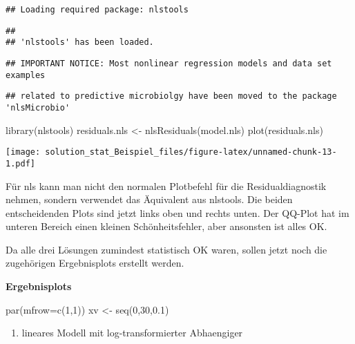 \documentclass[
]{article}
\newenvironment{Shaded}{\begin{snugshade}}{\end{snugshade}}
\newcommand{\AttributeTok}[1]{\textcolor[rgb]{0.77,0.63,0.00}{#1}}
\newcommand{\DecValTok}[1]{\textcolor[rgb]{0.00,0.00,0.81}{#1}}
\newcommand{\FloatTok}[1]{\textcolor[rgb]{0.00,0.00,0.81}{#1}}
\newcommand{\FunctionTok}[1]{\textcolor[rgb]{0.00,0.00,0.00}{#1}}
\newcommand{\NormalTok}[1]{#1}
\newcommand{\OtherTok}[1]{\textcolor[rgb]{0.56,0.35,0.01}{#1}}
\providecommand{\tightlist}{%
  \setlength{\itemsep}{0pt}\setlength{\parskip}{0pt}}
\begin{document}
\begin{verbatim}
## Loading required package: nlstools
\end{verbatim}

\begin{verbatim}
## 
## 'nlstools' has been loaded.
\end{verbatim}

\begin{verbatim}
## IMPORTANT NOTICE: Most nonlinear regression models and data set examples
\end{verbatim}

\begin{verbatim}
## related to predictive microbiolgy have been moved to the package 'nlsMicrobio'
\end{verbatim}

\begin{Shaded}
\begin{Highlighting}[]
\FunctionTok{library}\NormalTok{(nlstools)}
\NormalTok{residuals.nls }\OtherTok{\textless{}{-}} \FunctionTok{nlsResiduals}\NormalTok{(model.nls)}
\FunctionTok{plot}\NormalTok{(residuals.nls)}
\end{Highlighting}
\end{Shaded}

\texttt{[image: solution\_stat\_Beispiel\_files/figure-latex/unnamed-chunk-13-1.pdf]}

Für nls kann man nicht den normalen Plotbefehl für die
Residualdiagnostik nehmen, sondern verwendet das Äquivalent aus
nlstools. Die beiden entscheidenden Plots sind jetzt links oben und
rechts unten. Der QQ-Plot hat im unteren Bereich einen kleinen
Schönheitsfehler, aber ansonsten ist alles OK.

Da alle drei Lösungen zumindest statistisch OK waren, sollen jetzt noch
die zugehörigen Ergebnisplots erstellt werden.

\textbf{Ergebnisplots}

\begin{Shaded}
\begin{Highlighting}[]
\FunctionTok{par}\NormalTok{(}\AttributeTok{mfrow=}\FunctionTok{c}\NormalTok{(}\DecValTok{1}\NormalTok{,}\DecValTok{1}\NormalTok{))}
\NormalTok{xv }\OtherTok{\textless{}{-}} \FunctionTok{seq}\NormalTok{(}\DecValTok{0}\NormalTok{,}\DecValTok{30}\NormalTok{,}\FloatTok{0.1}\NormalTok{)}
\end{Highlighting}
\end{Shaded}

\begin{enumerate}
\def\labelenumi{\arabic{enumi}.}
\tightlist
\item
  lineares Modell mit log-transformierter Abhaengiger
\end{enumerate}
\end{document}
